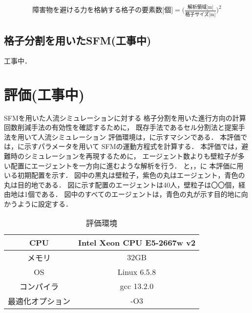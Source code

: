 

\begin{eqnarray}
 \mbox{障害物を避ける力を格納する格子の要素数[個]} =  \Big( \frac{\mbox{解析領域[m]}}{\mbox{格子サイズ[m]}} \Big) ^ 2
 \label{eq:fiw_youso_size}
\end{eqnarray}

\subsection{格子分割を用いたSFM(工事中)}
工事中．

\clearpage
\section{評価(工事中)}
SFMを用いた人流シミュレーションに対する
格子分割を用いた進行方向の計算回数削減手法の有効性を確認するために，
既存手法であるセル分割法と提案手法を用いて人流シミュレーション
評価環境は，に示すマシンである．
本評価では，に示すパラメータを用いて
SFMの運動方程式を計算する．
本評価では，避難時のシミュレーションを再現するために，
エージェント数よりも壁粒子が多い配置にエージェントを一方向に進むような解析を行う．
と，，に
本評価に用いる初期配置を示す．
図中の黒丸は壁粒子，紫色の丸はエージェント，青色の丸は目的地である．
図に示す配置のエージェントは40人，壁粒子は〇〇個，経由地は1個である．
図中のすべてのエージェントは，青色の丸が示す目的地に向かうように設定する．

\begin{table}[t]
  \begin{center}
    \caption{評価環境}
      \label{tb:result_env}
      \begin{tabular}{c|c}
      \hline \hline
      CPU              & Intel Xeon CPU E5-2667w v2 \\ \hline
      メモリ           & 32GB                       \\ \hline
      OS               & Linux 6.5.8               \\ \hline
      コンパイラ       & gcc 13.2.0                  \\ \hline
      最適化オプション & -O3                        \\ \hline
    \end{tabular}
  \end{center}
\end{table}


